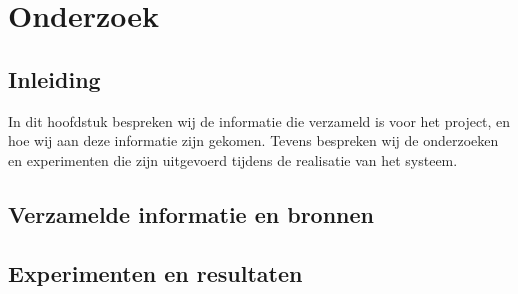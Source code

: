 \chapter{Onderzoek}
\section{Inleiding}
In dit hoofdstuk bespreken wij de informatie die verzameld is voor het project, en hoe wij aan deze informatie zijn gekomen.
Tevens bespreken wij de onderzoeken en experimenten die zijn uitgevoerd tijdens de realisatie van het systeem.
\newpage

\section{Verzamelde informatie en bronnen}


\section{Experimenten en resultaten}
